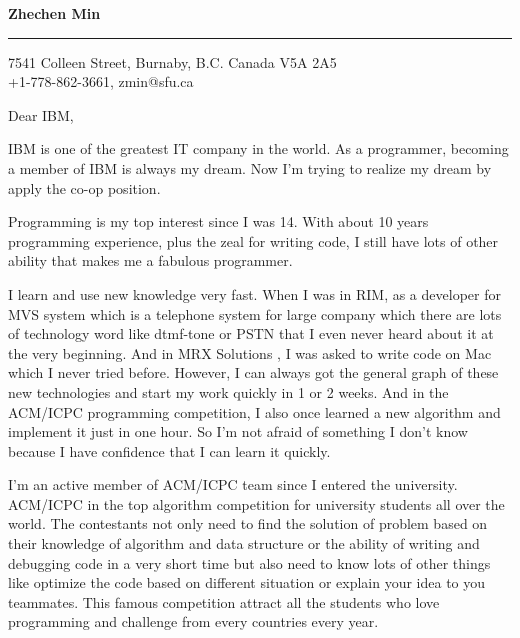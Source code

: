 \documentclass{letter} %
\begin{document}
\signature{Zhechen Min}           %
\longindentation=0pt                       %
\let\raggedleft\raggedright                %
 
 
\begin{letter}{}


\begin{flushleft}
{\large\bf Zhechen Min}
\end{flushleft}
\medskip\hrule height 1pt
\begin{flushright}
\hfill 7541 Colleen Street, Burnaby, B.C. Canada V5A 2A5 \\
\hfill +1-778-862-3661, zmin@sfu.ca
\end{flushright} 
\vfill %

 
\opening{Dear IBM,} 
 
\noindent IBM is one of the greatest IT company in the world. As a programmer, becoming a member of IBM is always my dream. Now I'm trying to realize my dream by apply the co-op position.

\noindent Programming is my top interest since I was 14. With about 10 years programming experience, plus the zeal for writing code, I still have lots of other ability that makes me a fabulous programmer. 

\noindent I learn and use new knowledge very fast. When I was in RIM, as a developer for MVS system which is a telephone system for large company which there are lots of technology word like dtmf-tone or PSTN that I even never heard about it at the very beginning. And in MRX Solutions , I was asked to write code on Mac which I never tried before. However, I can always got the general graph of these new technologies and start my work quickly in 1 or 2 weeks. And in the ACM/ICPC programming competition, I also once learned a new algorithm and implement it just in one hour. So I'm not afraid of something I don't know because I have confidence that I can learn it quickly. 

\noindent I'm an active member of ACM/ICPC team since I entered the university. ACM/ICPC in the top algorithm competition for university students all over the world. The contestants not only need to find the solution of problem based on their knowledge of algorithm and data structure or the ability of writing and debugging code in a very short time but also need to know lots of other things like optimize the code based on different situation or explain your idea to you teammates. This famous competition attract all the students who love programming and challenge from every countries every year.


\end{letter}
\end{document}

